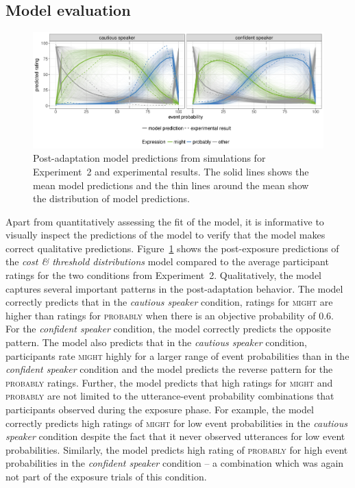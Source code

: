 \documentclass[man, floatsintext]{apa6}
\begin{document}
\subsection{Model evaluation}
\label{subsec:adaptation-model-evaluation}

\begin{figure}
  \includegraphics[width=\textwidth]{plots/adaptation-posterior-predictions-replication.pdf}
  \caption{Post-adaptation model predictions from simulations for Experiment~2 and experimental results. 
  The solid lines shows the mean model predictions and the thin lines around the mean show the distribution of model predictions. \label{fig:post-exposure-model}}
\end{figure}

Apart from quantitatively assessing the fit of the model, it is informative to visually inspect the predictions of the model to verify that the model makes correct qualitative predictions. 
Figure~\ref{fig:post-exposure-model} shows the post-exposure predictions of the \textit{cost \& threshold distributions} model compared to the average participant ratings for the two conditions from Experiment~2.
Qualitatively, 
the model captures several important patterns in the post-adaptation behavior. The model correctly predicts that in the \textit{cautious speaker} condition, ratings for \textsc{might} are 
higher than ratings for \textsc{probably} when there is an objective probability of 0.6. For the \textit{confident speaker} condition, the model correctly predicts the
opposite pattern. The model also predicts that in the \textit{cautious speaker} condition, participants rate \textsc{might} highly for a larger range of event probabilities than
in the \textit{confident speaker} condition and the model predicts the  reverse pattern for the \textsc{probably} ratings. Further, the model predicts that high ratings for \textsc{might} 
and \textsc{probably} are not limited to the utterance-event probability combinations that participants observed during the exposure phase. For example, the model correctly predicts
high ratings of \textsc{might} for low event probabilities in the \textit{cautious speaker} condition despite the fact that it never observed utterances for low event probabilities. Similarly,
the model predicts high rating of \textsc{probably} for high event probabilities in the \textit{confident speaker} condition -- a combination which was again not part of the exposure trials
of this condition.
\end{document}
